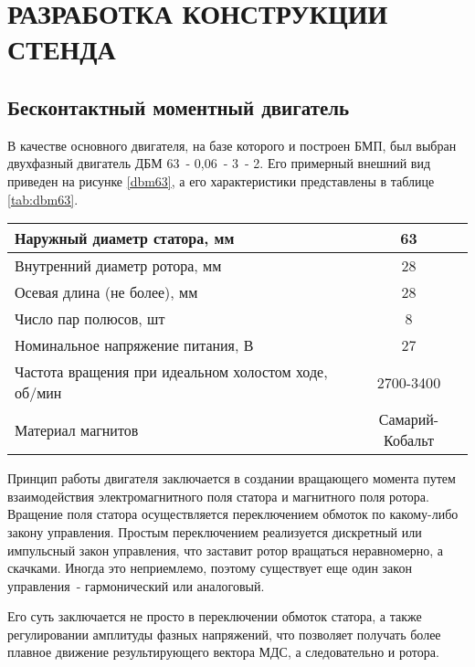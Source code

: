 \section{РАЗРАБОТКА КОНСТРУКЦИИ СТЕНДА}

\subsection{Бесконтактный моментный двигатель}

В качестве основного двигателя, на базе которого и построен БМП, 
был выбран двухфазный двигатель ДБМ 63~- 0,06~- 3~- 2. Его примерный внешний вид
приведен на рисунке \ref{dbm63}, а его характеристики представлены в таблице \ref{tab:dbm63}.


\begin{tabularx}{\textwidth}{|X|c|}
  \caption{Характеристики двигателя ДБМ 63~- 0,06~- 3~- 2}\label{tab:dbm63}\\
  \hline
    Наружный диаметр статора, мм & 63 \\
  \hline
    Внутренний диаметр ротора, мм & 28 \\
  \hline
    Осевая длина (не более), мм & 28 \\
  \hline
    Число пар полюсов, шт & 8 \\
  \hline
    Номинальное напряжение питания, В & 27 \\
  \hline
    Частота вращения при идеальном холостом ходе, об/мин & 2700-3400 \\
  \hline
    Материал магнитов & Самарий-Кобальт \\
  \hline
\end{tabularx}

Принцип работы двигателя заключается в создании вращающего момента
путем взаимодействия электромагнитного поля статора и магнитного поля ротора.
Вращение поля статора осуществляется переключением обмоток по какому-либо закону
управления. Простым переключением реализуется дискретный или импульсный закон
управления, что заставит ротор вращаться неравномерно, а скачками. Иногда это 
неприемлемо, поэтому существует еще один закон управления~- гармонический или аналоговый.

Его суть заключается не просто в переключении обмоток статора, а также регулировании
амплитуды фазных напряжений, что позволяет получать более плавное движение результирующего 
вектора  МДС, а следовательно и ротора.

